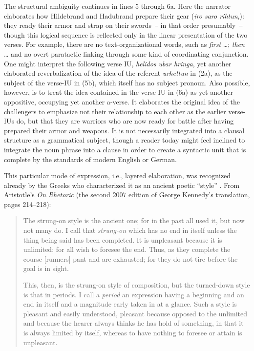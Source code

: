 The structural ambiguity continues in lines 5 through 6a. Here the narrator elaborates how Hildebrand and Hadubrand prepare their gear (\textit{iro saro rihtun},): they ready their armor and strap on their swords~--  in that order presumably~-- though this logical sequence is reflected only in the linear presentation of the two verses. For example, there are no text-organizational words, such as \textit{first} …; \textit{then} … and no overt paratactic linking through some kind of coordinating conjunction. One might interpret the following verse IU, \textit{helidos ubar hringa}, yet another elaborated reverbalization of the idea of the referent \textit{urhettun} in (2a), as the subject of the verse-IU in (5b), which itself has no subject pronoun. Also possible, however, is to treat the idea contained in the verse-IU in (6a) as yet another appositive, occupying yet another a-verse. It elaborates the original idea of the challengers to emphasize not their relationship to each other as the earlier verse-IUs do, but that they are warriors who are now ready for battle after having prepared their armor and weapons. It is not necessarily integrated into a clausal structure as a grammatical subject, though a reader today might feel inclined to integrate the noun phrase into a clause in order to create a syntactic unit that is complete by the standards of modern English or German.

This particular mode of expression, i.e., layered elaboration, was recognized already by the Greeks who characterized it as an ancient poetic “style” \citep[36--39]{Bakker1997}. From Aristotle’s \textit{On Rhetoric} (the second 2007 edition of George Kennedy’s translation, pages 214--218):

\begin{quote}
The strung-on style is the ancient one; for in the past all used it, but now not many do. I call that \textit{strung-on} which has no end in itself unless the thing being said has been completed. It is unpleasant because it is unlimited; for all wish to foresee the end. Thus, as they complete the course [runners] pant and are exhausted; for they do not tire before the goal is in sight.

This, then, is the strung-on style of composition, but the turned-down style is that in periods. I call a \textit{period} an expression having a beginning and an end in itself and a magnitude early taken in at a glance. Such a style is pleasant and easily understood, pleasant because opposed to the unlimited and because the hearer always thinks he has hold of something, in that it is always limited by itself, whereas to have nothing to foresee or attain is unpleasant.
\end{quote}

